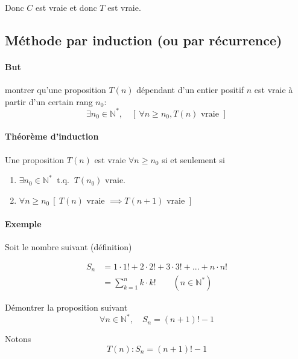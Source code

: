 \documentclass[
    11pt,
    a4paper,
    oneside,
    headinlcude, footinclude,
    twoside,
]{report}
\newcommand{\tq}[0]{\ \textrm{ t.q. }\ }
\begin{document}
Donc $C$ est vraie et donc $T$ est vraie.


\subsection{Méthode par induction (ou par récurrence)}
\label{sub:methode_par_induction_ou_par_recurrence_}

\paragraph{But}

montrer qu'une proposition $T(n)$ dépendant d'un entier positif $n$ est vraie
à partir d'un certain rang $n_{0}$: $$\exists n_{0} \in \mathbb{N}^{*}, \quad
[\ \forall n \geq n_{0}, T(n) \text{ vraie } ]$$

\paragraph{Théorème d'induction}
\label{par:theoreme_d_induction}

Une proposition $T(n)$ est vraie $\forall n \geq n_{0}$ si et seulement si 

\begin{enumerate}
    \item $\exists n_{0} \in \mathbb{N}^{*} \tq T(n_{0})$ vraie.
    \item $\forall n \geq n_{0} \ [\ T(n) \text{ vraie }  \implies T(n+1) \text{ vraie } ]$ 
\end{enumerate}

\paragraph{Exemple}

Soit le nombre suivant (définition)

\[
    \begin{split}
    S_{n} &= 1 \cdot 1! + 2 \cdot 2! + 3 \cdot 3! + ... + n\cdot n !\\
    &= \sum^{n}_{k=1} k\cdot k! \quad \quad (n \in \mathbb{N}^{*})
    \end{split}
\]

Démontrer la proposition suivant $$\forall n \in \mathbb{N}^{*}, \quad S_{n} =
(n+1)! -1$$

Notons $$T(n): S_{n} = (n+1)! -1$$
\end{document}
